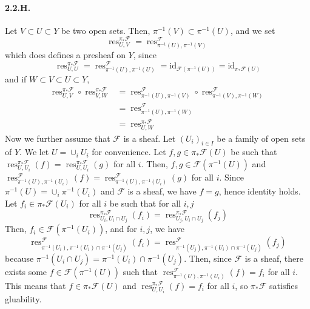 \documentclass{article}
\newcommand{\id}{\mathrm{id}}
\DeclareMathOperator{\res}{res}
\newcommand{\Fsheaf}{\mathscr{F}}
\begin{document}
\paragraph{2.2.H.} Let $V \subset U \subset Y$ be two open sets. Then, $\pi^{-1}(V) \subset \pi^{-1}(U)$, and we set 
\[\res^{\pi_* \Fsheaf}_{U,V} = \res^\Fsheaf_{\pi^{-1}(U),\pi^{-1}(V)}\]
which does defines a presheaf on $Y$, since
\[\res^{\pi_* \Fsheaf}_{U,U} = \res^\Fsheaf_{\pi^{-1}(U),\pi^{-1}(U)} = \id_{\Fsheaf(\pi^{-1}(U))} = \id_{\pi_*\Fsheaf(U)}\]
and if $W \subset V \subset U \subset Y$,
\begin{align*}
    \res^{\pi_* \Fsheaf}_{U,V} \circ \res^{\pi_* \Fsheaf}_{V,W} & = 
    \res^\Fsheaf_{\pi^{-1}(U),\pi^{-1}(V)} \circ \res^\Fsheaf_{\pi^{-1}(V),\pi^{-1}(W)} \\
    & = \res^\Fsheaf_{\pi^{-1}(U),\pi^{-1}(W)} \\
    & = \res^{\pi_* \Fsheaf}_{U,W}
\end{align*}
Now we further assume that $\Fsheaf$ is a sheaf. Let $(U_i)_{i\in I}$ be a family of open sets of $Y$. We let $U = \cup_i U_i$ for convenience. Let $f,g \in \pi_*\Fsheaf(U)$ be such that $\res^{\pi_*\Fsheaf}_{U,U_i}(f) = \res^{\pi_*\Fsheaf}_{U,U_i}(g)$ for all $i$. Then, $f,g \in \Fsheaf(\pi^{-1}(U))$ and $\res^\Fsheaf_{\pi^{-1}(U),\pi^{-1}(U_i)}(f) = \res^\Fsheaf_{\pi^{-1}(U),\pi^{-1}(U_i)}(g)$ for all $i$. Since $\pi^{-1}(U) = \cup_i \pi^{-1}(U_i)$ and $\Fsheaf$ is a sheaf, we have $f = g$, hence identity holds. \\
Let $f_i \in \pi_*\Fsheaf(U_i)$ for all $i$ be such that for all $i,j$
\[\res_{U_i, U_i\cap U_j}^{\pi_*\Fsheaf} (f_i) = \res_{U_j, U_i\cap U_j}^{\pi_*\Fsheaf} (f_j)\]
Then, $f_i \in \Fsheaf(\pi^{-1}(U_i))$, and for $i,j$, we have
\[\res_{\pi^{-1}(U_i), \pi^{-1}(U_i) \cap \pi^{-1}(U_j)}^{\Fsheaf} (f_i) = \res_{\pi^{-1}(U_j), \pi^{-1}(U_i) \cap \pi^{-1}(U_j)}^{\Fsheaf} (f_j)\]
because $\pi^{-1}(U_i \cap U_j) = \pi^{-1}(U_i) \cap \pi^{-1}(U_j)$. Then, since $\Fsheaf$ is a sheaf, there exists some $f \in \Fsheaf(\pi^{-1}(U))$ such that $\res_{\pi^{-1}(U),\pi^{-1}(U_i)}^{\Fsheaf}(f) = f_i$ for all $i$. This means that $f \in \pi_*\Fsheaf(U)$ and $\res_{U, U_i}^{\pi_*\Fsheaf} (f) = f_i$ for all $i$, so $\pi_*\Fsheaf$ satisfies gluability.
\end{document}
